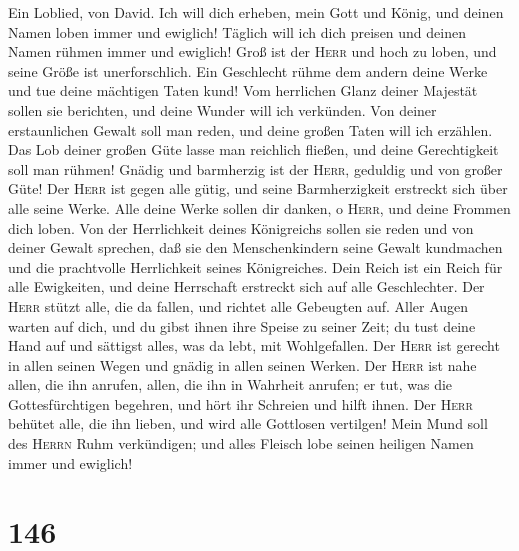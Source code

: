  Ein Loblied, von David. Ich will dich erheben, mein Gott
und König, und deinen Namen loben immer und ewiglich! 
Täglich will ich dich preisen und deinen Namen rühmen immer und
ewiglich!  Groß ist der \textsc{Herr} und hoch zu loben,
und seine Größe ist unerforschlich.  Ein Geschlecht rühme
dem andern deine Werke und tue deine mächtigen Taten kund!
 Vom herrlichen Glanz deiner Majestät sollen sie
berichten, und deine Wunder will ich verkünden.  Von
deiner erstaunlichen Gewalt soll man reden, und deine großen Taten will
ich erzählen.  Das Lob deiner großen Güte lasse man
reichlich fließen, und deine Gerechtigkeit soll man rühmen!
 Gnädig und barmherzig ist der \textsc{Herr}, geduldig und
von großer Güte!  Der \textsc{Herr} ist gegen alle gütig,
und seine Barmherzigkeit erstreckt sich über alle seine Werke.
 Alle deine Werke sollen dir danken, o \textsc{Herr}, und
deine Frommen dich loben.  Von der Herrlichkeit deines
Königreichs sollen sie reden und von deiner Gewalt sprechen,
 daß sie den Menschenkindern seine Gewalt kundmachen und
die prachtvolle Herrlichkeit seines Königreiches.  Dein
Reich ist ein Reich für alle Ewigkeiten, und deine Herrschaft erstreckt
sich auf alle Geschlechter.  Der \textsc{Herr} stützt
alle, die da fallen, und richtet alle Gebeugten auf. 
Aller Augen warten auf dich, und du gibst ihnen ihre Speise zu seiner
Zeit;  du tust deine Hand auf und sättigst alles, was da
lebt, mit Wohlgefallen.  Der \textsc{Herr} ist gerecht in
allen seinen Wegen und gnädig in allen seinen Werken. 
Der \textsc{Herr} ist nahe allen, die ihn anrufen, allen, die ihn in
Wahrheit anrufen;  er tut, was die Gottesfürchtigen
begehren, und hört ihr Schreien und hilft ihnen.  Der
\textsc{Herr} behütet alle, die ihn lieben, und wird alle Gottlosen
vertilgen!  Mein Mund soll des \textsc{Herrn} Ruhm
verkündigen; und alles Fleisch lobe seinen heiligen Namen immer und
ewiglich!

\hypertarget{section-145}{%
\section{146}\label{section-145}}

